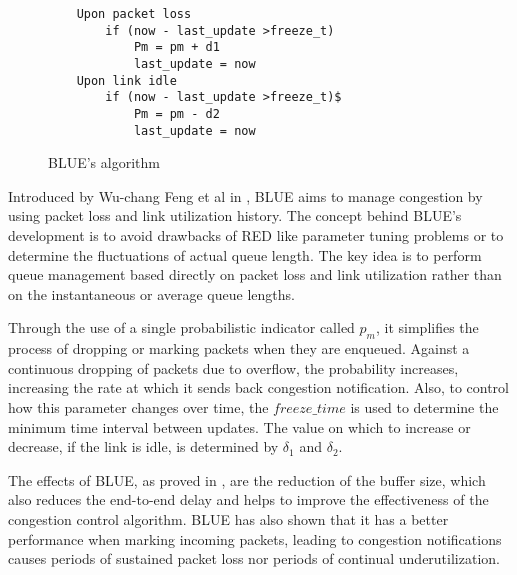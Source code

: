 \begin{wrapfigure}{r}{0.5\textwidth}
    \centering
	\begin{verbatim}
	Upon packet loss
	    if (now - last_update >freeze_t)
	        Pm = pm + d1
	        last_update = now
	Upon link idle
	    if (now - last_update >freeze_t)$
	        Pm = pm - d2
	        last_update = now
  	\end{verbatim}
    \caption{BLUE's algorithm}
    \label{fig:BLUEAlg}
\end{wrapfigure}

Introduced by Wu-chang Feng et al in \cite{FengBLUEAQM}, BLUE aims to manage
congestion by using packet loss and link utilization history. The concept
behind BLUE's development is to avoid drawbacks of RED like parameter tuning
problems or to determine the fluctuations of actual queue length. The key idea
is to perform queue management based directly on packet loss and link
utilization rather than on the instantaneous or average queue lengths.

Through the use of a single probabilistic indicator called $p_m$, it
simplifies the process of dropping or marking packets when they are enqueued.
Against a continuous dropping of packets due to overflow, the probability
increases, increasing the rate at which it sends back congestion notification.
Also, to control how this parameter changes over time, the
$freeze\_time$ is used to determine the minimum time interval between
updates.  The value on which to increase or decrease, if the link is idle, is
determined by $\delta_1$ and $\delta_2$.

The effects of BLUE, as proved in \cite{FengBLUEAQM}, are the reduction of the
buffer size, which also reduces the end-to-end delay and helps to improve the
effectiveness of the congestion control algorithm. BLUE has also shown that it
has a better performance when marking incoming packets, leading to congestion
notifications causes periods of sustained packet loss nor periods of continual
underutilization.
